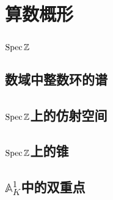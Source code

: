 \section{算数概形}
\subsection{$\operatorname{Spec} \mathbb{Z}$}
\subsection{数域中整数环的谱}
\subsection{$\operatorname{Spec} \mathbb{Z}$上的仿射空间}
\subsection{$\operatorname{Spec} \mathbb{Z}$上的锥}
\subsection{$\mathbb{A}_K^1$中的双重点}